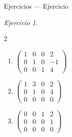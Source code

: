 \documentclass[aspectratio=169,11pt]{beamer}
\theoremstyle{remark}
\newtheorem{Ejer}[definicion]{Ejercicio}
\begin{document}
\begin{frame}[shrink=5]{Ejercicios — Ejercicio}
\begin{Ejer}
\begin{multicols}{2}
\begin{enumerate}[resume]
\item $\begin{pmatrix}1&0&0&2\\0&1&0&-1\\0&0&1&4\end{pmatrix}$
\item $\begin{pmatrix}1&3&0&2\\0&1&0&4\\0&0&0&0\end{pmatrix}$
\item $\begin{pmatrix}0&0&1&2\\0&0&0&1\\0&0&0&0\end{pmatrix}$
\end{enumerate}
\end{multicols}
\end{Ejer}
\end{frame}
\end{document}
